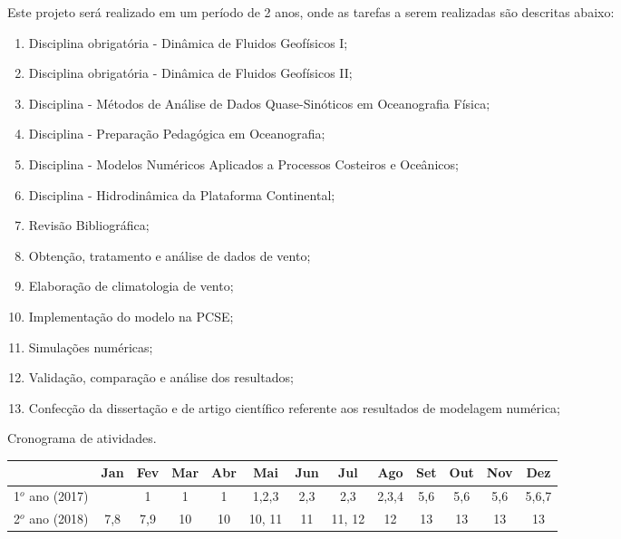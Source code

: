 \hspace{6mm} Este projeto será realizado em um período de 2 anos, onde as tarefas a serem
realizadas são descritas abaixo:

\begin{enumerate}
    \item Disciplina obrigatória - Dinâmica de Fluidos Geofísicos I;
    \item Disciplina obrigatória - Dinâmica de Fluidos Geofísicos II;
    \item Disciplina - Métodos de Análise de Dados Quase-Sinóticos em Oceanografia Física;
    \item Disciplina - Preparação Pedagógica em Oceanografia;
    \item Disciplina - Modelos Numéricos Aplicados a Processos Costeiros e Oceânicos;
    \item Disciplina - Hidrodinâmica da Plataforma Continental;
    \item Revisão Bibliográfica;
    \item Obtenção, tratamento e análise de dados de vento;
    \item Elaboração de climatologia de vento;
    \item Implementação do modelo na PCSE;
    \item Simulações numéricas;
    \item Validação, comparação e análise dos resultados;
    \item Confecção da dissertação e de artigo científico referente aos resultados
    de modelagem numérica;
\end{enumerate}

\begin{tablehere}
\centering
\caption{Cronograma de atividades.}
\label{my-label}
\begin{tabular}{|c|c|c|c|c|c|c|c|c|c|c|c|c|}
\hline
\textbf{}     & Jan & Fev & Mar & Abr & Mai    & Jun & Jul    & Ago   & Set & Out & Nov & Dez   \\ \hline
1$^o$ ano (2017) &     & 1   & 1   & 1   & 1,2,3  & 2,3 & 2,3    & 2,3,4 & 5,6 & 5,6 & 5,6 & 5,6,7 \\ \hline
2$^o$ ano (2018) & 7,8 & 7,9 & 10  & 10  & 10, 11 & 11  & 11, 12 & 12    & 13  & 13  & 13  & 13    \\ \hline
\end{tabular}
\end{tablehere}


